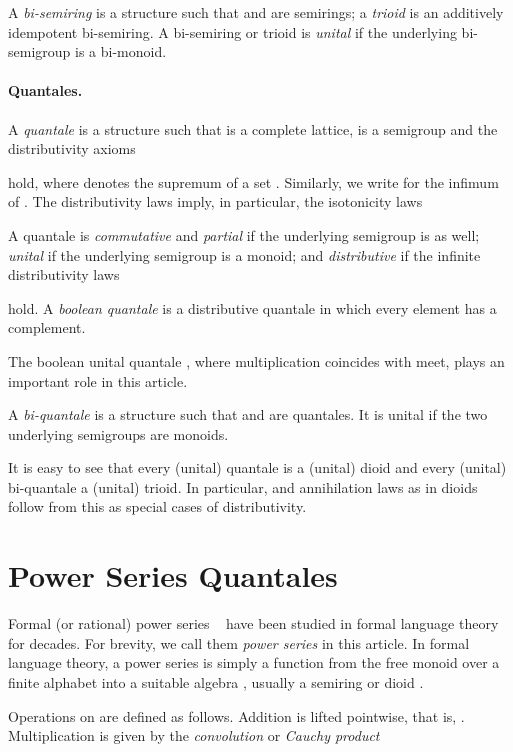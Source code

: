 \documentclass[12pt]{article}
\theoremstyle{definition}
\begin{document}
A \emph{bi-semiring} is a structure 
 such that  and 
 are semirings; a \emph{trioid} is an additively 
idempotent bi-semiring. A bi-semiring or trioid is \emph{unital} if 
the underlying bi-semigroup is a bi-monoid. 

\paragraph{Quantales.}
A \emph{quantale} is a structure  such that 
is a complete lattice,  is a semigroup and the
distributivity axioms

hold, where  denotes the supremum of a set . Similarly, we write  for the infimum of .  The
distributivity laws imply, in particular, the  isotonicity
laws
  
A quantale is \emph{commutative} and
\emph{partial} if the underlying semigroup is as well; \emph{unital} if the
underlying semigroup is a monoid; and \emph{distributive} if the
infinite distributivity laws

hold. A \emph{boolean quantale} is a distributive quantale in which
every element has a complement. 

The boolean unital quantale , where multiplication 
coincides with meet, plays an important role in this article.

A \emph{bi-quantale} is a structure  such that
 and  are quantales. It is unital if
the two underlying semigroups are monoids.

It is easy to see that every (unital) quantale is a (unital) dioid and
every (unital) bi-quantale a (unital) trioid. In particular,
 and annihilation laws as
in dioids follow from this as special cases of distributivity.



\section{Power Series Quantales}\label{sec:fpsquantale}

Formal (or rational) power series ~\cite{BerstelReutenauer} have been
studied in formal language theory for decades. For brevity, we call
them \emph{power series} in this article.
In formal language theory, a power series is simply a function from the
free monoid  over a finite alphabet  into a suitable
algebra , usually a semiring or dioid .

Operations on  are defined as follows. Addition is
lifted pointwise, that is, . Multiplication is
given by the \emph{convolution} or \emph{Cauchy product}
\end{document}
